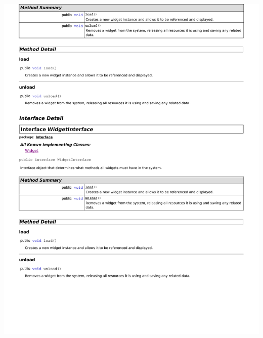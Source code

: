 \documentclass[letterpaper,12pt]{report}
\begin{document}
\newpage
\includegraphics[scale=0.9,trim=20mm 30mm 25mm 25mm]{externals/di12.pdf}
\newpage
\end{document}
